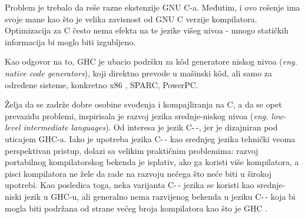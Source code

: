 Problem je trebalo da reše razne ekstenzije GNU C-a. Međutim, i ovo rešenje ima svoje mane kao što je velika zavisnost od GNU C verzije kompilatora. Optimizacija za C često nema efekta na te jezike višeg nivoa - mnogo statičkih informacija bi moglo biti izgubljeno. 

Kao odgovor na to, GHC je ubacio podršku za k\^{o}d generatore niskog nivoa (\emph{eng. native code generators}), koji direktno prevode u mašinski k\^{o}d, ali samo za određene sisteme, konkretno x86 , SPARC, PowerPC.

Želja da se zadrže dobre osobine svođenja i kompajliranja na C, a da se opet prevaziđu problemi, inspirisala je razvoj jezika srednje-niskog nivoa (\emph{eng. low-level intermediate languages}). Od interesa je jezik C-\,-, jer je dizajniran pod uticajem GHC-a. Iako je upotreba jezika C-\,- kao srednjeg jezika tehnički veoma perspektivan pristup, dolazi sa velikim praktičnim problemima: razvoj portabilnog kompilatorskog bekenda je isplativ, ako ga koristi više kompilatora, a pisci kompilatora ne žele da rade na razvoju nečega što neće biti u širokoj upotrebi. Kao posledica toga, neka varijanta C-\,- jezika se koristi kao srednje-niski jezik u GHC-u, ali generalno nema razvijenog bekenda u jeziku C-\,- koja bi mogla biti podržana od strane većeg broja kompilatora kao što je GHC \cite{SPJ92}.

